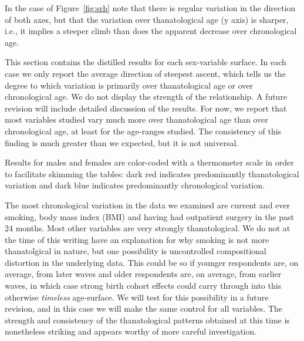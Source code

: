 \documentclass{article}
\begin{document}
In the case of Figure~\ref{fig:srh} note that there is regular variation in the
direction of both axes, but that the variation over thanatological age (y axis)
is sharper, i.e., it implies a steeper climb than does the apparent decrease
over chronological age. 

This section contains the distilled results for each sex-variable surface. In
each case we only report the average direction of steepest ascent, which tells
us the degree to which variation is primarily over thanatological age or over
chronological age. We do not display the strength of the
relationship.
A future revision will include detailed discussion of the results. For now, we
report that most variables studied vary much more over thanatological age
than over chronological age, at least for the age-ranges studied. The
consistency of this finding is much greater than we expected, but it is not
universal. 

Results for males and females are color-coded with a thermometer scale in order
to facilitate skimming the tables: dark red indicates
predominantly thanatological variation and dark blue indicates
predominantly chronological variation.

The most chronological variation in the data we examined are current and ever
smoking, body mass index (BMI) and having had outpatient surgery in the past 24
months. Most other variables are very strongly thanatological. We do not at the
time of this writing have an explanation for why smoking is not more
thanatolgical in nature, but one possibility is uncontrolled compositional
distortion in the underlying data. This could be so if younger respondents are,
on average, from later waves and older respondents are, on average, from earlier
waves, in which case strong birth cohort effects could carry through into this
otherwise \textit{timeless} age-surface. We will test for this possibility in a future
revision, and in this case we will make the same control for all variables. The
strength and consistency of the thanatological patterns obtained at this time is
nonetheless striking and appears worthy of more careful
investigation.
\end{document}
